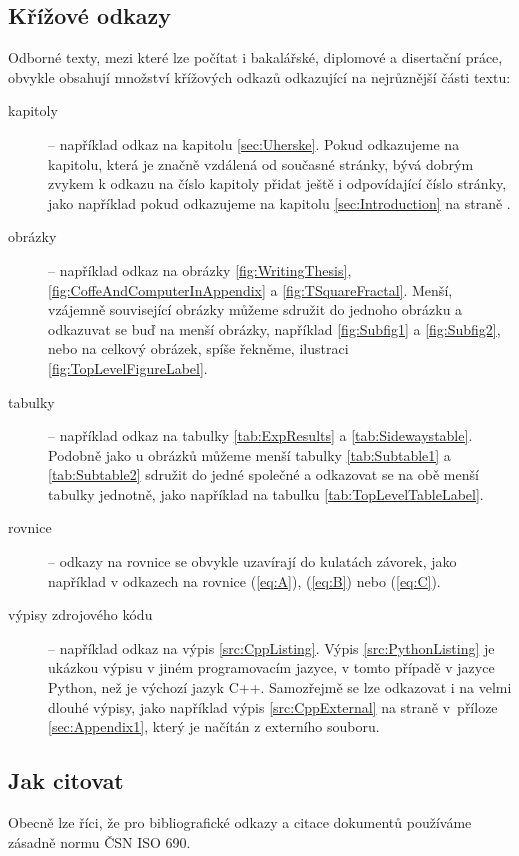 \documentclass[czech,bachelor,dept460,male,cpp,cpdeclaration]{diploma}
\begin{document}
\subsection{Křížové odkazy}
\label{sec:CrossReferences}
Odborné texty, mezi které lze počítat i bakalářské, diplomové a disertační práce, obvykle obsahují množství křížových odkazů odkazující na nejrůznější části textu:
\begin{description}
	\item [kapitoly] -- například odkaz na kapitolu \ref{sec:Uherske}. Pokud odkazujeme na kapitolu, která je značně vzdálená od současné stránky, bývá dobrým zvykem k odkazu na číslo kapitoly přidat ještě i odpovídající číslo stránky, jako například pokud odkazujeme na kapitolu \ref{sec:Introduction} na straně \pageref{sec:Introduction}.

	\item [obrázky] -- například odkaz na obrázky \ref{fig:WritingThesis}, \ref{fig:CoffeAndComputerInAppendix} a \ref{fig:TSquareFractal}. Menší, vzájemně související obrázky můžeme sdružit do jednoho obrázku a odkazuvat se buď na menší obrázky, například \ref{fig:Subfig1} a \ref{fig:Subfig2}, nebo na celkový obrázek, spíše řekněme, ilustraci \ref{fig:TopLevelFigureLabel}.

	\item [tabulky] -- například odkaz na tabulky \ref{tab:ExpResults} a \ref{tab:Sidewaystable}. Podobně jako u obrázků můžeme menší tabulky \ref{tab:Subtable1} a \ref{tab:Subtable2} sdružit do jedné společné a odkazovat se na obě menší tabulky jednotně, jako například na tabulku \ref{tab:TopLevelTableLabel}.

	\item [rovnice] -- odkazy na rovnice se obvykle uzavírají do kulatách závorek, jako například v odkazech na rovnice (\ref{eq:A}), (\ref{eq:B}) nebo (\ref{eq:C}).

	\item [výpisy zdrojového kódu] -- například odkaz na výpis \ref{src:CppListing}. Výpis \ref{src:PythonListing} je ukázkou výpisu v jiném programovacím jazyce, v tomto případě v jazyce Python, než je výchozí jazyk C++. Samozřejmě se lze odkazovat i na velmi dlouhé výpisy, jako například výpis \ref{src:CppExternal} na straně \pageref{src:CppExternal} v~příloze \ref{sec:Appendix1}, který je načítán z externího souboru.
\end{description}

\subsection{Jak citovat}
Obecně lze říci, že pro bibliografické odkazy a citace dokumentů používáme zásadně normu ČSN ISO 690.
\end{document}
